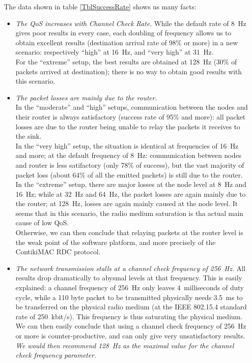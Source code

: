 \documentclass[a4paper,twoside]{article}
\begin{document}
The data shown in table \ref{TblSuccessRate} shows us many facts:

\begin{itemize}

\item \emph{The QoS increases with Channel Check Rate.} While the default
rate of 8~Hz gives poor results in every case, each doubling of frequency
allows us to obtain excellent results (destination arrival rate of 98\%
or more) in a new scenario: respectively ``high'' at 16~Hz, and ``very
high'' at 31~Hz.\\
For the ``extreme'' setup, the best results are obtained at 128~Hz
(30\% of packets arrived at destination); there is no way to obtain
good results with this scenario.

\item \emph{The packet losses are mainly due to the router.}\\
In the ``moderate'' and ``high'' setups, communication between the nodes
and their router is always satisfactory (success rate of 95\% and more):
all packet losses are due to the router being unable to relay the packets
it receives to the sink.\\
In the ``very high'' setup, the situation is identical at frequencies
of 16~Hz and more; at the default frequency of 8~Hz: communication between
nodes and router is less satifactory (only 78\% of success), but the vast
majority of packet loss (about 64\% of all the emitted packets) is still
due to the router.\\
In the ``extreme'' setup, there are major losses at the node level at 8~Hz
and 16~Hz; while at 32~Hz and 64~Hz, the packet losses are again mainly due
to the router; at 128~Hz, losses are again mainly caused at the node level.
It seems that in this scenario, the radio medium saturation is tha actual
main cause of low QoS.\\
Otherwise, we can then conclude that relaying packets at the router level
is the weak point of the software platform, and more precisely of the
ContikiMAC RDC protocol.

\item \emph{The network transmission stalls at a channel check frequency
of 256~Hz.} All results drop dramatically to abysmal levels at that
frequency. This is easily explained: a channel frequency of 256~Hz only
leaves 4~milliseconds of duty cycle, while a 110 byte packet to be
transmitted physically needs 3.5~ms to be transferred on the physical
radio medium (at the IEEE 802.15.4 standard rate of 250~kbit/s).
This frequency is thus saturating the physical medium. We can then easily
conclude that using a channel check frequency of 256~Hz or more is
counter-productive, and can only give very unsatisfactory results.\\
\emph{We would then recommend 128~Hz as the maximal value for the channel
check frequency parameter.}

\end{itemize}
\end{document}
